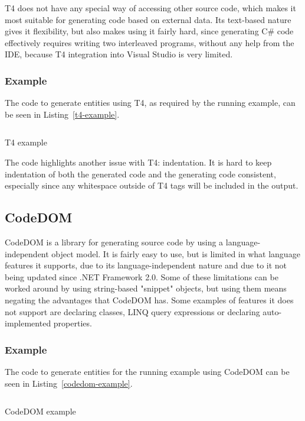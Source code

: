 \ac{T4} does not have any special way of accessing other source code, which makes it most suitable for generating code based on external data. Its text-based nature gives it flexibility, but also makes using it fairly hard, since generating C\# code effectively requires writing two interleaved programs, without any help from the \ac{IDE}, because \ac{T4} integration into Visual Studio is very limited.

\subsubsection{Example}

The code to generate entities using \ac{T4}, as required by the running example, can be seen in Listing~\ref{t4-example}.

\begin{listing}
\inputminted{text}{samples/T4/Entities.tt}
\caption{\ac{T4} example}
\label{t4-example}
\end{listing}

The code highlights another issue with \ac{T4}: indentation. It is hard to keep indentation of both the generated code and the generating code consistent, especially since any whitespace outside of \ac{T4} tags will be included in the output.

\subsection{CodeDOM}

\ac{CodeDOM} is a library for generating source code by using a language-independent object model. It is fairly easy to use, but is limited in what language features it supports, due to its language-independent nature and due to it not being updated since .NET Framework 2.0. Some of these limitations can be worked around by using string-based "snippet" objects, but using them means negating the advantages that CodeDOM has. Some examples of features it does not support are declaring  classes, LINQ query expressions or declaring auto-implemented properties.

\subsubsection{Example}

The code to generate entities for the running example using CodeDOM can be seen in Listing~\ref{codedom-example}.

\begin{listing}
\inputminted[firstline=14,lastline=60]{csharp}{samples/CodeDOM/Program.cs}
\caption{CodeDOM example}
\label{codedom-example}
\end{listing}


